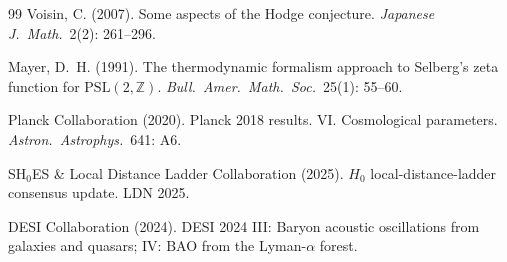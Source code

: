 \documentclass[11pt,a4paper]{article}
\theoremstyle{plain}
\theoremstyle{definition}
\begin{document}
\begin{thebibliography}{99}
Voisin, C. (2007). Some aspects of the Hodge conjecture.
\emph{Japanese J.\ Math.}\ 2(2): 261--296.

Mayer, D.~H. (1991). The thermodynamic formalism approach to
Selberg's zeta function for $\mathrm{PSL}(2, \mathbb{Z})$.
\emph{Bull.\ Amer.\ Math.\ Soc.}\ 25(1): 55--60.

Planck Collaboration (2020). Planck 2018 results. VI. Cosmological
parameters. \emph{Astron.\ Astrophys.}\ 641: A6.

SH$_{0}$ES \& Local Distance Ladder Collaboration (2025). $H_{0}$
local-distance-ladder consensus update. LDN 2025.

DESI Collaboration (2024). DESI 2024 III: Baryon acoustic oscillations
from galaxies and quasars; IV: BAO from the Lyman-$\alpha$ forest.

\end{thebibliography}
\end{document}
